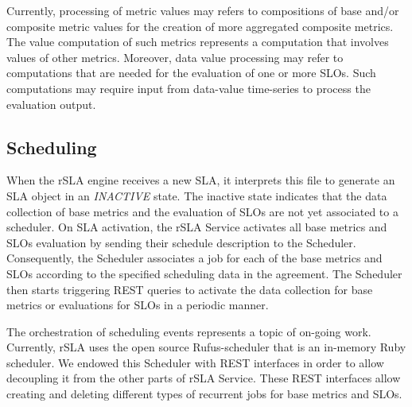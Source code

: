Currently, processing of metric values may refers to compositions of base and/or composite metric values  for the creation of more aggregated composite metrics. The value computation of such metrics represents a computation that involves values of other metrics. Moreover, data value processing may refer to computations that are needed for the evaluation of one or more SLOs. Such computations may require input from data-value time-series to process the evaluation output.



\subsection{Scheduling}\label{schedule}


When the rSLA engine receives a new SLA, it interprets this file to generate an SLA object in an \emph{INACTIVE} state. The inactive state indicates that 
the data collection of base metrics and the evaluation of SLOs are not yet associated to a scheduler. On SLA activation, the rSLA Service activates all base metrics and SLOs 
evaluation by sending their schedule description to the Scheduler. Consequently, the Scheduler associates a job for each of the base metrics and SLOs according to the specified 
scheduling data in the agreement. The Scheduler then starts triggering REST queries to activate the data collection for base metrics or evaluations for SLOs in a periodic manner. 


The orchestration of scheduling events represents a topic of on-going work. Currently, rSLA uses the open source Rufus-scheduler that is an in-memory Ruby scheduler. We endowed 
this Scheduler with REST interfaces in order to allow decoupling it from the other parts of rSLA Service. These REST interfaces allow creating and deleting different types of 
recurrent jobs for base metrics and SLOs. 

